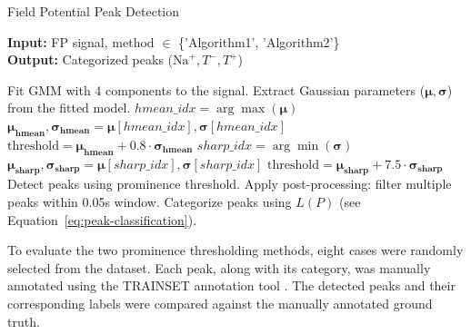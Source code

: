 \documentclass{report}
\begin{document}
            \begin{algorithm}[H]
            \caption{Field Potential Peak Detection}
            \label{alg:peak-detection}
            \textbf{Input:} FP signal, method \(\in\) \{'Algorithm1', 'Algorithm2'\} \\
            \textbf{Output:} Categorized peaks (\(\text{Na}^+, T^-, T^+\))
            \begin{algorithmic}[1]
                \State Fit GMM with 4 components to the signal.
                \State Extract Gaussian parameters (\(\bm{\mu}, \bm{\sigma}\)) from the fitted model.
                    \State \( hmean\_idx = \arg\max(\bm{\mu}) \)
                    \State \( \bm{\mu_{\text{hmean}}}, \bm{\sigma_{\text{hmean}}} = \bm{\mu}[hmean\_idx], \bm{\sigma}[hmean\_idx] \)
                    \State \( \text{threshold} = \bm{\mu_{\text{hmean}}} + 0.8 \cdot \bm{\sigma_{\text{hmean}}} \)
                    \State \( sharp\_idx = \arg\min(\bm{\sigma}) \)
                    \State \( \bm{\mu_{\text{sharp}}}, \bm{\sigma_{\text{sharp}}} = \bm{\mu}[sharp\_idx], \bm{\sigma}[sharp\_idx] \)
                    \State \( \text{threshold} = \bm{\mu_{\text{sharp}}} + 7.5 \cdot \bm{\sigma_{\text{sharp}}} \)
                \EndIf
                \State Detect peaks using prominence threshold.
                \State Apply post-processing: filter multiple peaks within 0.05s window.
                \State Categorize peaks using \(L(P)\) (see Equation~\ref{eq:peak-classification}).
            \end{algorithmic}
            \end{algorithm}
            
            To evaluate the two prominence thresholding methods, eight cases were randomly selected from the dataset. Each peak, along with its category, was manually annotated using the TRAINSET annotation tool \cite{trainset}. The detected peaks and their corresponding labels were compared against the manually annotated ground truth.
            
\end{document}
